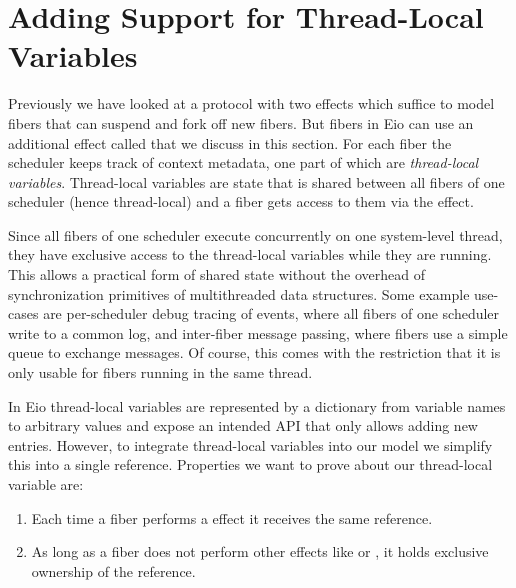 \section{Adding Support for Thread-Local Variables}
\label{sec:thread-local-vars}


Previously we have looked at a protocol with two effects which suffice to model fibers that can suspend and fork off new fibers.
But fibers in Eio can use an additional effect called \egetctx{} that we discuss in this section.
For each fiber the scheduler keeps track of context metadata, one part of which are \emph{thread-local variables}.
Thread-local variables are state that is shared between all fibers of one scheduler (hence thread-local) and a fiber gets access to them via the \egetctx{} effect.


Since all fibers of one scheduler execute concurrently on one system-level thread, they have exclusive access to the thread-local variables while they are running.
This allows a practical form of shared state without the overhead of synchronization primitives of multithreaded data structures.
Some example use-cases are per-scheduler debug tracing of events, where all fibers of one scheduler write to a common log,
and inter-fiber message passing, where fibers use a simple queue to exchange messages.
Of course, this comes with the restriction that it is only usable for fibers running in the same thread.


In Eio thread-local variables are represented by a dictionary from variable names to arbitrary values and expose an intended API that only allows adding new entries.
However, to integrate thread-local variables into our model we simplify this into a single reference.
Properties we want to prove about our thread-local variable are:
\begin{enumerate}
  \item Each time a fiber performs a \egetctx{} effect it receives the same reference.
  \item As long as a fiber does not perform other effects like \efork{} or \esuspend{}, it holds exclusive ownership of the reference.
\end{enumerate}

